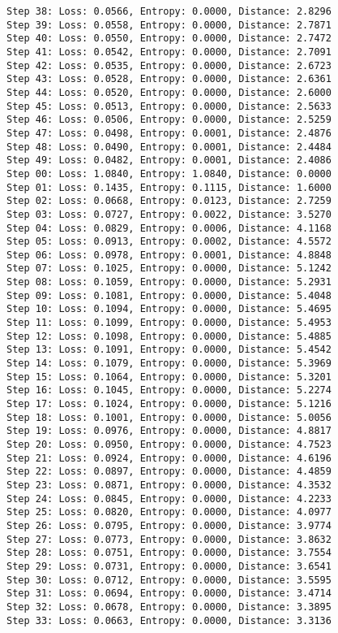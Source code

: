 \documentclass[11pt]{article}
\begin{document}
\begin{Verbatim}[commandchars=\\\{\}]
Step 38: Loss: 0.0566, Entropy: 0.0000, Distance: 2.8296
Step 39: Loss: 0.0558, Entropy: 0.0000, Distance: 2.7871
Step 40: Loss: 0.0550, Entropy: 0.0000, Distance: 2.7472
Step 41: Loss: 0.0542, Entropy: 0.0000, Distance: 2.7091
Step 42: Loss: 0.0535, Entropy: 0.0000, Distance: 2.6723
Step 43: Loss: 0.0528, Entropy: 0.0000, Distance: 2.6361
Step 44: Loss: 0.0520, Entropy: 0.0000, Distance: 2.6000
Step 45: Loss: 0.0513, Entropy: 0.0000, Distance: 2.5633
Step 46: Loss: 0.0506, Entropy: 0.0000, Distance: 2.5259
Step 47: Loss: 0.0498, Entropy: 0.0001, Distance: 2.4876
Step 48: Loss: 0.0490, Entropy: 0.0001, Distance: 2.4484
Step 49: Loss: 0.0482, Entropy: 0.0001, Distance: 2.4086
Step 00: Loss: 1.0840, Entropy: 1.0840, Distance: 0.0000
Step 01: Loss: 0.1435, Entropy: 0.1115, Distance: 1.6000
Step 02: Loss: 0.0668, Entropy: 0.0123, Distance: 2.7259
Step 03: Loss: 0.0727, Entropy: 0.0022, Distance: 3.5270
Step 04: Loss: 0.0829, Entropy: 0.0006, Distance: 4.1168
Step 05: Loss: 0.0913, Entropy: 0.0002, Distance: 4.5572
Step 06: Loss: 0.0978, Entropy: 0.0001, Distance: 4.8848
Step 07: Loss: 0.1025, Entropy: 0.0000, Distance: 5.1242
Step 08: Loss: 0.1059, Entropy: 0.0000, Distance: 5.2931
Step 09: Loss: 0.1081, Entropy: 0.0000, Distance: 5.4048
Step 10: Loss: 0.1094, Entropy: 0.0000, Distance: 5.4695
Step 11: Loss: 0.1099, Entropy: 0.0000, Distance: 5.4953
Step 12: Loss: 0.1098, Entropy: 0.0000, Distance: 5.4885
Step 13: Loss: 0.1091, Entropy: 0.0000, Distance: 5.4542
Step 14: Loss: 0.1079, Entropy: 0.0000, Distance: 5.3969
Step 15: Loss: 0.1064, Entropy: 0.0000, Distance: 5.3201
Step 16: Loss: 0.1045, Entropy: 0.0000, Distance: 5.2274
Step 17: Loss: 0.1024, Entropy: 0.0000, Distance: 5.1216
Step 18: Loss: 0.1001, Entropy: 0.0000, Distance: 5.0056
Step 19: Loss: 0.0976, Entropy: 0.0000, Distance: 4.8817
Step 20: Loss: 0.0950, Entropy: 0.0000, Distance: 4.7523
Step 21: Loss: 0.0924, Entropy: 0.0000, Distance: 4.6196
Step 22: Loss: 0.0897, Entropy: 0.0000, Distance: 4.4859
Step 23: Loss: 0.0871, Entropy: 0.0000, Distance: 4.3532
Step 24: Loss: 0.0845, Entropy: 0.0000, Distance: 4.2233
Step 25: Loss: 0.0820, Entropy: 0.0000, Distance: 4.0977
Step 26: Loss: 0.0795, Entropy: 0.0000, Distance: 3.9774
Step 27: Loss: 0.0773, Entropy: 0.0000, Distance: 3.8632
Step 28: Loss: 0.0751, Entropy: 0.0000, Distance: 3.7554
Step 29: Loss: 0.0731, Entropy: 0.0000, Distance: 3.6541
Step 30: Loss: 0.0712, Entropy: 0.0000, Distance: 3.5595
Step 31: Loss: 0.0694, Entropy: 0.0000, Distance: 3.4714
Step 32: Loss: 0.0678, Entropy: 0.0000, Distance: 3.3895
Step 33: Loss: 0.0663, Entropy: 0.0000, Distance: 3.3136

\end{Verbatim}
\end{document}
